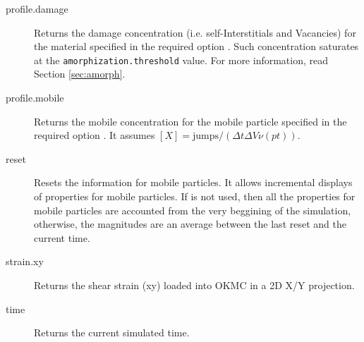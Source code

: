 \begin{description}
\item [profile.damage] Returns the damage concentration (i.e. self-Interstitials and Vacancies) for the material specified in the required option . Such concentration saturates at the {\tt amorphization.threshold} value. For more information, read Section \ref{sec:amorph}.

\item [profile.mobile]  Returns the mobile concentration for the mobile particle specified in the required option . It assumes $[X] = \mathrm{jumps} / (\Delta t \Delta V \nu(pt))$.

\item [reset] Resets the information for mobile particles. It allows incremental displays of properties for mobile particles. If  is not used, then all the properties for mobile particles are accounted from the very beggining of the simulation, otherwise, the magnitudes are an average between the last reset and the current time.

\item [strain.xy] Returns the shear strain (xy) loaded into OKMC in a 2D X/Y projection.

\item [time] Returns the current simulated time.

\end{description}

